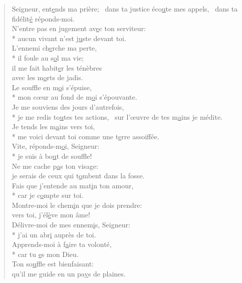 
\begin{verse}
Seigneur, ent\underline{e}nds ma prière;~\psalmdagger
dans ta justice éco\underline{u}te mes appels,~\psalmstar
dans ta fidélit\underline{é} réponds-moi. \\
N’entre pas en jugement av\underline{e}c ton serviteur: \\*
aucun vivant n’est j\underline{u}ste devant toi. \\

L’ennemi ch\underline{e}rche ma perte, \\*
il foule au s\underline{o}l ma vie; \\
il me fait habit\underline{e}r les ténèbres \\
avec les m\underline{o}rts de jadis. \\
Le souffle en m\underline{o}i s’épuise, \\*
mon cœur au fond de m\underline{o}i s’épouvante. \\

Je me souviens des jours d’autrefois, \\*
je me redis to\underline{u}tes tes actions,~\psalmstar
sur l’œuvre de tes m\underline{a}ins je médite. \\
Je tends les m\underline{a}ins vers toi, \\*
me voici devant toi comme une t\underline{e}rre assoiffée. \\

Vite, réponds-m\underline{o}i, Seigneur: \\*
je suis à bo\underline{u}t de souffle! \\
Ne me cache p\underline{a}s ton visage: \\
je serais de ceux qui t\underline{o}mbent dans la fosse. \\

Fais que j’entende au mat\underline{i}n ton amour, \\*
car je c\underline{o}mpte sur toi. \\
Montre-moi le chem\underline{i}n que je dois prendre: \\
vers toi, j’él\underline{è}ve mon âme! \\

Délivre-moi de mes ennem\underline{i}s, Seigneur: \\*
j’ai un abr\underline{i} auprès de toi. \\
Apprends-moi à f\underline{a}ire ta volonté, \\*
car tu \underline{e}s mon Dieu. \\
Ton so\underline{u}ffle est bienfaisant: \\
qu’il me guide en un pa\underline{y}s de plaines. \\


\end{verse}
